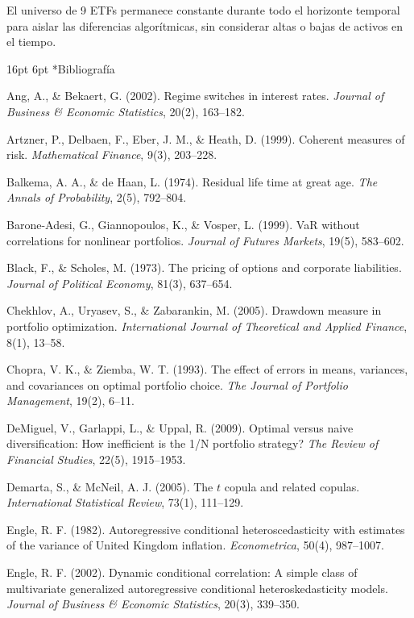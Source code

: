 \documentclass[11pt,a4paper]{article}
\makeatletter
\renewcommand\section{\@startsection{section}{1}{\z@}%
  {16pt \@plus 3pt \@minus 2pt}%
  {6pt}%
  {\centering\large\bfseries\color{navyblue}}}
\makeatother
\begin{document}
El universo de 9 ETFs permanece constante durante todo el horizonte temporal para aislar las diferencias algorítmicas, sin considerar altas o bajas de activos en el tiempo.

\section*{Bibliografía}
\begingroup
\sloppy
\setlength{\leftskip}{1.25em}
\setlength{\parindent}{-1.25em}
\small

Ang, A., \& Bekaert, G. (2002). Regime switches in interest rates. \textit{Journal of Business \& Economic Statistics}, 20(2), 163--182.

Artzner, P., Delbaen, F., Eber, J. M., \& Heath, D. (1999). Coherent measures of risk. \textit{Mathematical Finance}, 9(3), 203--228.

Balkema, A. A., \& de Haan, L. (1974). Residual life time at great age. \textit{The Annals of Probability}, 2(5), 792--804.

Barone-Adesi, G., Giannopoulos, K., \& Vosper, L. (1999). VaR without correlations for nonlinear portfolios. \textit{Journal of Futures Markets}, 19(5), 583--602.

Black, F., \& Scholes, M. (1973). The pricing of options and corporate liabilities. \textit{Journal of Political Economy}, 81(3), 637--654.

Chekhlov, A., Uryasev, S., \& Zabarankin, M. (2005). Drawdown measure in portfolio optimization. \textit{International Journal of Theoretical and Applied Finance}, 8(1), 13--58.

Chopra, V. K., \& Ziemba, W. T. (1993). The effect of errors in means, variances, and covariances on optimal portfolio choice. \textit{The Journal of Portfolio Management}, 19(2), 6--11.

DeMiguel, V., Garlappi, L., \& Uppal, R. (2009). Optimal versus naive diversification: How inefficient is the 1/N portfolio strategy? \textit{The Review of Financial Studies}, 22(5), 1915--1953.

Demarta, S., \& McNeil, A. J. (2005). The $t$ copula and related copulas. \textit{International Statistical Review}, 73(1), 111--129.

Engle, R. F. (1982). Autoregressive conditional heteroscedasticity with estimates of the variance of United Kingdom inflation. \textit{Econometrica}, 50(4), 987--1007.

Engle, R. F. (2002). Dynamic conditional correlation: A simple class of multivariate generalized autoregressive conditional heteroskedasticity models. \textit{Journal of Business \& Economic Statistics}, 20(3), 339--350.
\end{document}
